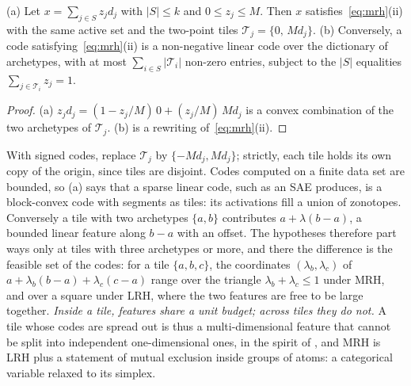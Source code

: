 \documentclass[sigconf,nonacm,screen]{acmart}
\newcommand{\cT}{\mathcal{T}}
\begin{document}
\begin{proposition}
\label{prop:nested}
(a) Let $x=\sum_{j\in S}z_jd_j$ with $|S|\le k$ and $0\le z_j\le M$. Then $x$ satisfies~\eqref{eq:mrh}(ii)
with the same active set and the two-point tiles $\cT_j=\{0,\,Md_j\}$.
(b) Conversely, a code satisfying~\eqref{eq:mrh}(ii) is a non-negative linear code over the dictionary of
archetypes, with at most $\sum_{i\in S}|\cT_i|$ non-zero entries, subject to the $|S|$ equalities
$\sum_{j\in\cT_i}z_j=1$.
\end{proposition}
\begin{proof}
(a) $z_jd_j=(1-z_j/M)\,0+(z_j/M)\,Md_j$ is a convex combination of the two archetypes of $\cT_j$.
(b) is a rewriting of~\eqref{eq:mrh}(ii).
\end{proof}

With signed codes, replace $\cT_j$ by $\{-Md_j,Md_j\}$; strictly, each tile holds its own copy of the
origin, since tiles are disjoint. Codes computed on a finite data set are bounded, so (a) says that a
sparse linear code, such as an SAE produces, is a block-convex code with segments as tiles: its
activations fill a union of zonotopes. Conversely a tile with two archetypes $\{a,b\}$ contributes
$a+\lambda(b-a)$, a bounded linear feature along $b-a$ with an offset. The hypotheses therefore part
ways only at tiles with three archetypes or more, and there the difference is the feasible set of the
codes: for a tile $\{a,b,c\}$, the coordinates $(\lambda_b,\lambda_c)$ of $a+\lambda_b(b-a)+\lambda_c(c-a)$
range over the triangle $\lambda_b+\lambda_c\le1$ under MRH, and over a square under LRH, where the two
features are free to be large together. \emph{Inside a tile, features share a unit budget; across tiles
they do not.} A tile whose codes are spread out is thus a multi-dimensional feature that cannot be split into independent
one-dimensional ones, in the spirit of \citet{engels2025not}, and MRH is LRH plus a statement of mutual
exclusion inside groups of atoms: a categorical variable relaxed to its simplex.
\end{document}
